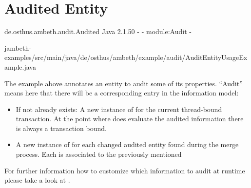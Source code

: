 \goodbreak
\section{Audited Entity}
\label{feature:AuditedEntity}

\feature
	{de.osthus.ambeth.audit.Audited}
	{Java}
	{2.1.50}
	{-}
	{-}
	{module:Audit}
	{-}

	{jambeth-examples/src/main/java/de/osthus/ambeth/example/audit/AuditEntityUsageExample.java}

The example above annotates an entity to audit some of its properties. ``Audit'' means here that there will be a corresponding entry in the information model:

\begin{itemize}
	\item If not already exists: A new instance of  for the current thread-bound transaction. At the point where  does evaluate the audited information there is always a transaction bound.
	\item A new instance of  for each changed audited entity found during the merge process. Each  is associated to the previously mentioned 
\end{itemize}

For further information how to customize which information to audit at runtime please take a look at .


 